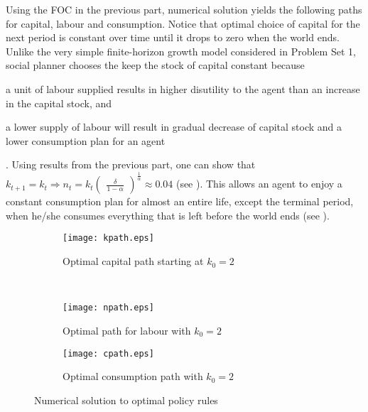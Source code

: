 \documentclass[]{article}
\begin{document}
Using the FOC in the previous part, numerical solution yields the following paths for capital, labour and consumption. Notice that optimal choice of capital for the next period is constant over time until it drops to zero when the world ends. Unlike the very simple finite-horizon growth model considered in Problem Set 1, social planner chooses the keep the stock of capital constant because \begin{enumerate*}[label=\roman*)]\item a unit of labour supplied results in higher disutility to the agent than an increase in the capital stock, and \item a lower supply of labour will result in gradual decrease of capital stock and a lower consumption plan for an agent \end{enumerate*}. Using results from the previous part, one can show that $k_{t+1} = k_t \Longrightarrow n_t = k_t\begin{pmatrix}\frac{\delta}{1 - \alpha}\end{pmatrix}^{\frac{1}{\alpha}} \approx 0.04$ (see ). This allows an agent to enjoy a constant consumption plan for almost an entire life, except the terminal period, when he/she consumes everything that is left before the world ends (see ).

\begin{figure}[h]
	\centering
	\begin{subfigure}{0.5\textwidth}
		\centering
		\texttt{[image: kpath.eps]}
		\caption{Optimal capital path starting at $k_0 = 2$}
		\label{fig:ex4kpath}
	\end{subfigure}~
	\begin{subfigure}{0.5\textwidth}
		\centering
		\texttt{[image: npath.eps]}
		\caption{Optimal path for labour with $k_0 = 2$}
		\label{fig:ex4npath}
	\end{subfigure}
	\begin{subfigure}{0.5\textwidth}
		\centering
		\texttt{[image: cpath.eps]}
		\caption{Optimal consumption path with $k_0 = 2$}
		\label{fig:ex4cpath}
	\end{subfigure}
	\caption{Numerical solution to optimal policy rules}
	\label{fig:ex4}
\end{figure}
\end{document}
